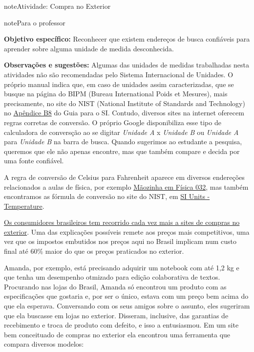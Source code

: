 \begin{sphinxadmonition}{note}{Atividade: Compra no Exterior}

\begin{sphinxadmonition}{note}{Para o professor}

\textbf{Objetivo específico:} Reconhecer que existem endereços de busca confiáveis para aprender sobre alguma unidade de medida desconhecida.

\textbf{Observações e sugestões:} Algumas das unidades de medidas trabalhadas nesta atividades não são recomendadas pelo Sistema Internacional de Unidades. O próprio manual indica que, em caso de unidades assim caracterizadas, que se busque na página do BIPM (Bureau International Poids et Mesures), mais precisamente, no site do NIST (National Institute of Standards and Technology) no \href{https://www.nist.gov/physical-measurement-laboratory/nist-guide-si-appendix-b8}{Apêndice B8} do Guia para o SI. Contudo, diversos sites na internet oferecem regras corretas de conversão. O próprio Google disponibiliza esse tipo de calculadora de conversção ao se digitar \textit{Unidade A} x \textit{Unidade B} ou \textit{Unidade A} para \textit{Unidade B} na barra de busca. Quando sugerimos ao estudante a pesquisa, queremos que ele não apenas encontre, mas que também compare e decida por uma fonte confiável.

A regra de conversão de Celsius para Fahrenheit aparece em diversos endereções relacionados a aulas de física, por exemplo \href{https://youtu.be/REpQB5clONM}{Mãozinha em Física 032}, mas também encontramos as fórmula de conversão no site do NIST, em \href{https://www.nist.gov/pml/weights-and-measures/si-units-temperature}{SI Units - Temperature}.
\end{sphinxadmonition}

\href{https://www.folhanit.com.br/2018/09/17/brasileiros-gastam-cada-vez-mais-em-sites-de-compras-internacionais/}{Os consumidores brasileiros tem recorrido cada vez mais a sites de compras no exterior}. Uma das explicações possíveis remete aos preços mais competitivos, uma vez que os impostos embutidos nos preços aqui no Brasil implicam num custo final até 60\% maior do que os preços praticados no exterior.

Amanda, por exemplo, está precisando adquirir um notebook com até 1,2 kg e que tenha um desempenho otmizado para edição colaborativa de textos. Procurando nas lojas do Brasil, Amanda só encontrou um produto com as especificações que gostaria e, por ser o único, estava com um preço bem acima do que ela esperava. Conversando com os seus amigos sobre o assunto, eles sugeriram que ela buscasse em lojas no exterior. Disseram, inclusive, das garantias de recebimento e troca de produto com defeito, e isso a entusiasmou. Em um site bem conceituado de compras no exterior ela encontrou uma ferramenta que compara diversos modelos:


\end{sphinxadmonition}

